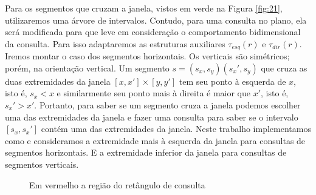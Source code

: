 Para os segmentos que cruzam a janela, vistos em verde na Figura \ref{fig:21}, utilizaremos uma árvore de intervalos. Contudo, para uma consulta no plano, ela será modificada para que leve em consideração o comportamento bidimensional da consulta. Para isso adaptaremos as estruturas auxiliares $\tau_{esq}(r)$ e $\tau_{dir}(r)$.
Iremos montar o caso dos segmentos horizontais. Os verticais são simétricos; porém, na orientação vertical. Um segmento $s= (s_x,s_y) (s_x',s_y)$ que cruza as duas extremidades da janela $[x, x'] \times [y, y']$ tem seu ponto à esquerda de $x$, isto é, $s_x < x$ e similarmente seu ponto mais à direita é maior que $x'$, isto é,  $s_x' > x'$. Portanto, para saber se um segmento cruza a janela podemos escolher uma das extremidades da janela e fazer uma consulta para saber se o intervalo $[s_x, s_x']$ contém uma das extremidades da janela. Neste trabalho implementamos como \cite{cgi1} e consideramos a extremidade mais à esquerda da janela para consultas de segmentos horizontais. E a extremidade inferior da janela para consultas de segmentos verticais.
\begin{figure}[h]
\centering
{}
\caption {Em vermelho a região do retângulo de consulta}
\label{fig:23}
\end{figure}

